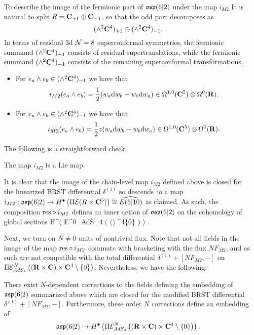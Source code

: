 \documentclass[../main.tex]{subfiles}
\begin{document}
To describe the image of the fermionic part of $\mathfrak{osp}(6|2)$ under the map $i_{M2}$ It is natural to split $R = \mathbf{C}_{+1} \oplus \mathbf{C}_{-1}$, so that the odd part decomposes as
\[
(\wedge^2 \mathbf{C}^4)_{+1} \oplus (\wedge^2 \mathbf{C}^4)_{-1} .
\]
In terms of residual 3d $\mathcal{N}=8$ superconformal symmetries, the fermionic summand $(\wedge^2 \mathbf{C}^4)_{+1}$ consists of residual supertranslations, while the fermionic summand $(\wedge^2 \mathbf{C}^4)_{-1}$ consists of the remaining superconformal transformations. 

\begin{itemize}
\item 
For $e_a\wedge e_b\in (\wedge^2 \mathbf{C}^4)_{+1}$ we have that 
\[
i_{M2} (e_a\wedge e_b) = \frac{1}{2} (w_a \mathrm{d} w_b - w_b \mathrm{d} w_a) \in \Omega^{1,0}(\mathbf{C}^5) \otimes \Omega^0(\mathbf{R}) .
\] 
\item For $e_a\wedge e_b\in (\wedge^2 \mathbf{C}^4)_{-1}$ we have that 
\[
i_{M2} (e_a\wedge e_b) = \frac{1}{2} z (w_a \mathrm{d} w_b - w_b \mathrm{d} w_a) \in \Omega^{1,0}(\mathbf{C}^5) \otimes \Omega^0(\mathbf{R}). 
\] 
\end{itemize}

The following is a straightforward check.

\begin{lem}\label{lem:m2emb}
The map $i_{M2}$ is a Lie map.
\end{lem} 

It is clear that the image of the chain-level map $i_{M2}$ defined above is closed for the linearized BRST differential $\delta^{(1)}$ so descends to a map $i_{M2}: \mathfrak{osp}(6|2) \to H^\bullet \left ( \Pi \mathcal{E} (R\times \mathbf{C}^5)\right )\cong\widehat{E(5|10) }$ as claimed. As such, the composition $\mathrm{res}\circ i_{M2}$ defines an inner action of $\mathfrak{osp}(6|2)$ on the cohomology of global sections 
\beqn
H^\bullet \left ( \Pi \mc E^0_{AdS_4} \left ( (\R\times \C) \times \C^4\setminus \{0\} \right ) \right ) .
\eeqn

\parsec[]

Next, we turn on $N \ne 0$ units of nontrivial flux. Note that not all fields in the image of the map $\mathrm{res}\circ i_{M2}$ commute with bracketing with the flux $N F_{M2}$, and as such are not compatible with the total differential $\delta^{(1)} + [N F_{M2}, -]$ on $\Pi \mathcal{E}^N_{AdS_4} \left ( (\mathbf{R}\times \mathbf{C}) \times \mathbf{C}^4\setminus \{0\} \right )$. Nevertheless, we have the following:

\begin{prop}
\label{prop:brads4}
There exist $N$-dependent corrections to the fields defining the embedding of $\mathfrak{osp}(6|2)$ summarized above which are closed for the modified BRST differential $\delta^{(1)} + [N F_{M2},-]$. 
Furthermore, these order $N$ corrections define an embedding of 
\[\mathfrak{osp}(6|2) \to H^\bullet \left ( \Pi \mathcal{E}^N_{AdS_4} \left ( (\mathbf{R}\times \mathbf{C}) \times \mathbf{C}^4\setminus \{0\} \right ) \right ) .\]
\end{prop}
\end{document}

